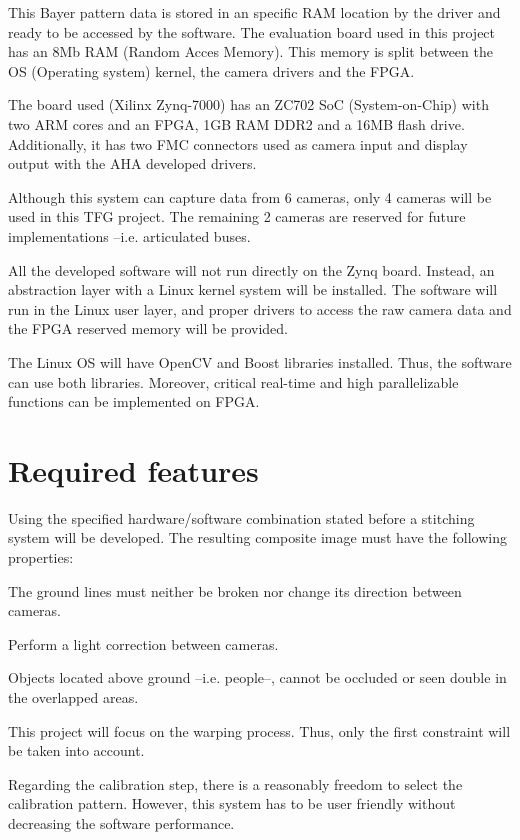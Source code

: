 This Bayer pattern data is stored in an specific RAM location by the driver and ready to be accessed by the software.  The evaluation board used in this project has an 8Mb RAM (Random Acces Memory). This memory is split between the OS (Operating system) kernel, the camera drivers and the FPGA. 

The board used (Xilinx Zynq-7000) has an ZC702 SoC (System-on-Chip) with two ARM cores and an FPGA,  1GB RAM DDR2 and a 16MB flash drive. Additionally, it has two FMC connectors used as camera input and display output with the AHA developed drivers.

Although this system can capture data from 6 cameras, only 4 cameras will be used in this TFG project. The remaining 2 cameras are reserved for future implementations --i.e. articulated buses.

All the developed software will not run directly on the Zynq board. Instead, an abstraction layer with a Linux kernel system will be installed. The software will run in the Linux user layer, and proper drivers to access the raw camera data and the FPGA reserved memory will be provided. 

The Linux OS will have OpenCV and Boost libraries installed. Thus, the software can use both libraries. Moreover, critical real-time and high parallelizable functions can be implemented on FPGA.

\section{Required features}\label{sec:algorithm}
Using the specified hardware/software combination stated before a stitching system will be developed. The resulting composite image must have the following properties:
\vspace{-1em}
\begin{description}[font=\normalfont\textsl]\itemsep2pt \parskip1pt 
\item [Non-discontinuities on ground lines --i.e. lane lanes.] The ground lines must neither be broken nor change its direction between cameras.
\item [Exposure compensation.] Perform a light correction between cameras.
\item [Avoid double-images or ghost images.] Objects located above ground --i.e. people--, cannot be occluded or seen double in the overlapped areas.
\end{description}
\vspace{-1em}
This project will focus on the warping process. Thus, only the first constraint will be taken into account.

Regarding the calibration step, there is a reasonably freedom to select the calibration pattern. However, this system has to be user friendly without decreasing the software performance. 